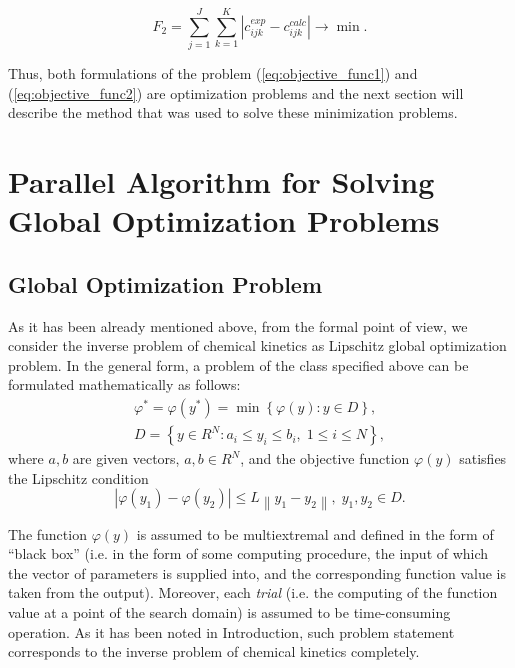 \documentclass{svproc}
\begin{document}
\begin{equation}
  F_2 = \sum_{j=1}^J \sum_{k=1}^K \left| c_{ijk}^{exp} - c_{ijk}^{calc} \right| \longrightarrow \min.
  \label{eq:objective_func2} 
\end{equation}

Thus, both formulations of the problem (\ref{eq:objective_func1}) and (\ref{eq:objective_func2}) are optimization problems and the next section will describe the method that was used to solve these minimization problems.

\section{Parallel Algorithm for Solving Global Optimization Problems }\label{Sec_GSA}

\subsection{Global Optimization Problem}

As it has been already mentioned above, from the formal point of view, we consider the inverse problem of chemical kinetics as Lipschitz global optimization problem. In the general form, a problem of the class specified above can be formulated mathematically as 
follows:
\begin{gather}
 \varphi^* = \varphi(y^\ast)=\min{\left\{\varphi(y):y\in D\right\}}, \label{problemN}\\
 D=\left\{y\in R^N: a_i\leq y_i \leq b_i, \;  1\leq i \leq N\right\} \label{D},
\end{gather}
where $a,b$ are given vectors, $a,b\in R^N$, and the objective function $\varphi(y)$ satisfies the Lipschitz condition
\begin{equation}\label{Lip}
\left|\varphi(y_1)-\varphi(y_2)\right|\leq L\left\|y_1-y_2\right\|,\; y_1,y_2 \in D.
\end{equation}

The function $\varphi(y)$ is assumed to be multiextremal and defined in the form of ``black box'' (i.e. in the form of some computing procedure, the input of which the  vector of parameters is supplied into, and the corresponding function value is taken from the output). Moreover, each \textit{trial} (i.e. the computing of the function value at a point of the search domain) is assumed to be time-consuming operation. 
As it has been noted in Introduction, such problem statement corresponds to the inverse problem of chemical kinetics completely.
\end{document}
